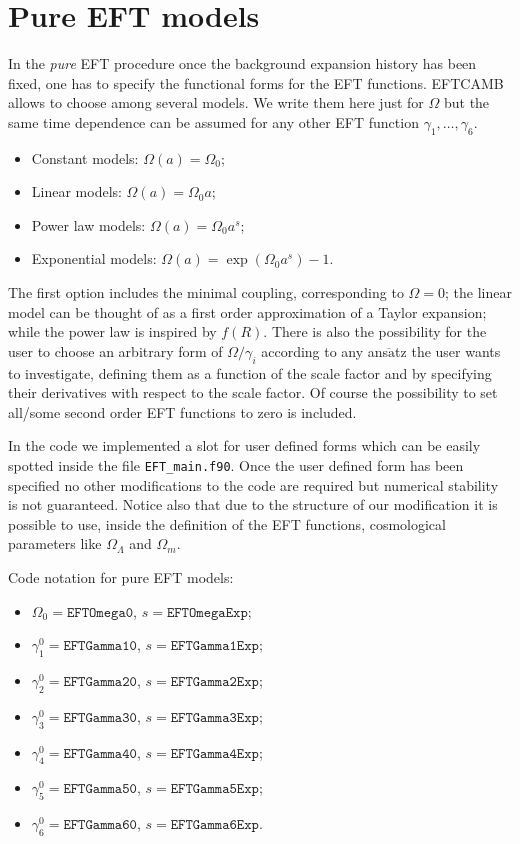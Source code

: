 \documentclass[prd,nofootinbib,showpacs]{revtex4}
\begin{document}
{%
\section{Pure EFT models}\label{Sec:PureEFTmodels}
%
In the \textit{pure} EFT procedure once the background expansion history has been fixed, one has to specify the functional forms for the EFT functions.  EFTCAMB allows to choose among several models. We write them here just for $\Omega$ but the same time dependence can be assumed for any other EFT function $\gamma_1,\dots,\gamma_6$.
%
\begin{itemize}
\item[] Constant models: $\Omega(a)=\Omega_0$; 
\item[] Linear models: $\Omega(a)=\Omega_0 a$;
\item[] Power law models: $\Omega(a)=\Omega_0 a^s$;
\item[] Exponential models: $\Omega(a)=  \exp{\left(\Omega_0 a^s\right)}-1$.
\end{itemize}
%

The first option includes the minimal coupling, corresponding to $\Omega=0$; the linear model  can be thought of as a first order approximation of a Taylor expansion; while the power law is inspired by $f(R)$. There is also the possibility for the user to choose an arbitrary form of $\Omega/\gamma_i$  according to any ans$\ddot{\text{a}}$tz the user wants to investigate, defining them as a function of the scale factor and by specifying their derivatives with respect to the scale factor.  Of course the possibility to set all/some second order EFT functions to zero is included.

In the code we implemented a slot for user defined forms which can be easily spotted inside the file \verb|EFT_main.f90|.
Once the user defined form has been specified no other modifications to the code are required but numerical stability is not guaranteed.
Notice also that due to the structure of our modification it is possible to use, inside the definition of the EFT functions, cosmological parameters like $\Omega_\Lambda$ and $\Omega_m$. 

Code notation for pure EFT models:
%
\begin{itemize}
\item $\Omega_0 = \texttt{EFTOmega0}$, $s = \texttt{EFTOmegaExp}$;
\item $\gamma_1^0 = \texttt{EFTGamma10}$, $s = \texttt{EFTGamma1Exp}$;
\item $\gamma_2^0 = \texttt{EFTGamma20}$, $s = \texttt{EFTGamma2Exp}$;
\item $\gamma_3^0 = \texttt{EFTGamma30}$, $s = \texttt{EFTGamma3Exp}$;
\item $\gamma_4^0 = \texttt{EFTGamma40}$, $s = \texttt{EFTGamma4Exp}$;
\item $\gamma_5^0 = \texttt{EFTGamma50}$, $s = \texttt{EFTGamma5Exp}$;
\item $\gamma_6^0 = \texttt{EFTGamma60}$, $s = \texttt{EFTGamma6Exp}$.
\end{itemize}


}
\end{document}
